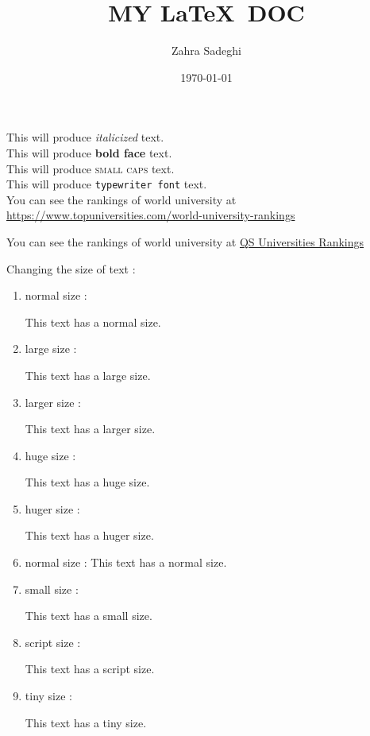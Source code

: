 \documentclass[11pt]{article}
\title{MY \LaTeX\ DOC}
\author{Zahra Sadeghi}
\date{\today}
\begin{document}
\tableofcontents
\maketitle

This will produce \textit{italicized} text.\\
This will produce \textbf{bold face} text.\\
This will produce \textsc{small caps} text.\\
This will produce \texttt{typewriter font} text.\\
You can see the rankings of world university at \url{https://www.topuniversities.com/world-university-rankings}

You can see the rankings of world university at \href{https://www.topuniversities.com/world-university-rankings}{QS Universities Rankings}

\vspace{1cm}


Changing the size of text :
\begin{enumerate}
\item normal size :
\begin{normalsize}This text has a normal size.\end{normalsize}
\item large size :
\begin{large}This text has a large size.\end{large}
\item larger size :
\begin{Large}This text has a larger size.\end{Large}
\item huge size :
\begin{huge}This text has a huge size.\end{huge}
\item huger size :
\begin{Huge}This text has a huger size.\end{Huge}
\item normal size :
This text has a normal size.
\item small size :
\begin{small}This text has a small size.\end{small}
\item script size :
\begin{scriptsize}This text has a script size.\end{scriptsize}
\item tiny size :
\begin{tiny}This text has a tiny size.\end{tiny}
\end{enumerate}
\end{document}
